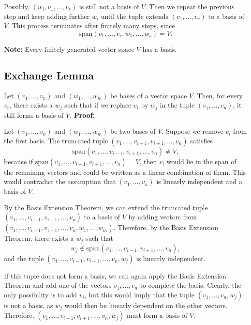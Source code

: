 Possibly, \((w_i, v_1, \ldots, v_r)\) is still not a basis of \(V\). Then we repeat the previous step and keep adding further \(w_i\) until the tuple extends \((v_1, \ldots, v_r)\) to a basis of \(V\). This process terminates after finitely many steps, since
\[
\text{span}(v_1, \ldots, v_r, w_1, \ldots, w_s) = V.
\]
\QED

\textbf{Note:} Every finitely generated vector space \(V\) has a basis.

\subsection{Exchange Lemma}

Let \((v_1, \ldots, v_n)\) and \((w_1, \ldots, w_m)\) be bases of a vector space \(V\). Then, for every \(v_i\), there exists a \(w_j\) such that if we replace \(v_i\) by \(w_j\) in the tuple \((v_1, \ldots, v_n)\), it still forms a basis of \(V\).
\newline
\textbf{Proof:}

Let \((v_1, \ldots, v_n)\) and \((w_1, \ldots, w_m)\) be two bases of \(V\). Suppose we remove \(v_i\) from the first basis. The truncated tuple \((v_1, \ldots, v_{i-1}, v_{i+1}, \ldots, v_n)\) satisfies
\[
\text{span}(v_1, \ldots, v_{i-1}, v_{i+1}, \ldots, v_n) \neq V,
\]
because if \(\text{span}(v_1, \ldots, v_{i-1}, v_{i+1}, \ldots, v_n) = V\), then \(v_i\) would lie in the span of the remaining vectors and could be written as a linear combination of them. This would contradict the assumption that \((v_1, \ldots, v_n)\) is linearly independent and a basis of \(V\).

By the Basis Extension Theorem, we can extend the truncated tuple \((v_1, \ldots, v_{i-1}, v_{i+1}, \ldots, v_n)\) to a basis of \(V\) by adding vectors from \((v_1, \ldots, v_{i-1}, v_{i+1}, \ldots, v_n, w_1, \ldots, w_m)\). Therefore, by the Basis Extension Theorem, there exists a \(w_j\) such that
\[
w_j \notin \text{span}(v_1, \ldots, v_{i-1}, v_{i+1}, \ldots, v_n),
\]
and the tuple \((v_1, \ldots, v_{i-1}, v_{i+1}, \ldots, v_n, w_j)\) is linearly independent.

If this tuple does not form a basis, we can again apply the Basis Extension Theorem and add one of the vectors \(v_1, \ldots, v_n\) to complete the basis. Clearly, the only possibility is to add \(v_i\), but this would imply that the tuple \((v_1, \ldots, v_n, w_j)\) is not a basis, as \(w_j\) would then be linearly dependent on the other vectors. Therefore, \((v_1, \ldots, v_{i-1}, v_{i+1}, \ldots, v_n, w_j)\) must form a basis of \(V\).

